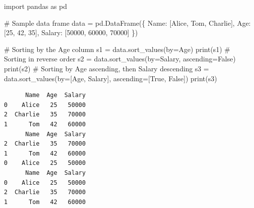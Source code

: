 \documentclass[
  english,
  letterpaper,
  DIV=11,
  numbers=noendperiod]{scrreprt}
\newenvironment{Shaded}{\begin{snugshade}}{\end{snugshade}}
\newcommand{\BuiltInTok}[1]{\textcolor[rgb]{0.00,0.23,0.31}{#1}}
\newcommand{\CommentTok}[1]{\textcolor[rgb]{0.37,0.37,0.37}{#1}}
\newcommand{\DecValTok}[1]{\textcolor[rgb]{0.68,0.00,0.00}{#1}}
\newcommand{\ImportTok}[1]{\textcolor[rgb]{0.00,0.46,0.62}{#1}}
\newcommand{\NormalTok}[1]{\textcolor[rgb]{0.00,0.23,0.31}{#1}}
\newcommand{\OperatorTok}[1]{\textcolor[rgb]{0.37,0.37,0.37}{#1}}
\newcommand{\StringTok}[1]{\textcolor[rgb]{0.13,0.47,0.30}{#1}}
\newcommand{\VariableTok}[1]{\textcolor[rgb]{0.07,0.07,0.07}{#1}}
\begin{document}
\begin{Shaded}
\begin{Highlighting}[]
\ImportTok{import}\NormalTok{ pandas }\ImportTok{as}\NormalTok{ pd}

\CommentTok{\# Sample data frame}
\NormalTok{data }\OperatorTok{=}\NormalTok{ pd.DataFrame(\{}
    \StringTok{\textquotesingle{}Name\textquotesingle{}}\NormalTok{: [}\StringTok{\textquotesingle{}Alice\textquotesingle{}}\NormalTok{, }\StringTok{\textquotesingle{}Tom\textquotesingle{}}\NormalTok{, }\StringTok{\textquotesingle{}Charlie\textquotesingle{}}\NormalTok{],}
    \StringTok{\textquotesingle{}Age\textquotesingle{}}\NormalTok{: [}\DecValTok{25}\NormalTok{, }\DecValTok{42}\NormalTok{, }\DecValTok{35}\NormalTok{],}
    \StringTok{\textquotesingle{}Salary\textquotesingle{}}\NormalTok{: [}\DecValTok{50000}\NormalTok{, }\DecValTok{60000}\NormalTok{, }\DecValTok{70000}\NormalTok{]}
\NormalTok{\})}

\CommentTok{\# Sorting by the \textquotesingle{}Age\textquotesingle{} column}
\NormalTok{s1 }\OperatorTok{=}\NormalTok{ data.sort\_values(by}\OperatorTok{=}\StringTok{\textquotesingle{}Age\textquotesingle{}}\NormalTok{)}
\BuiltInTok{print}\NormalTok{(s1)}
\CommentTok{\# Sorting in reverse order}
\NormalTok{s2 }\OperatorTok{=}\NormalTok{ data.sort\_values(by}\OperatorTok{=}\StringTok{\textquotesingle{}Salary\textquotesingle{}}\NormalTok{, ascending}\OperatorTok{=}\VariableTok{False}\NormalTok{)}
\BuiltInTok{print}\NormalTok{(s2)}
\CommentTok{\# Sorting by \textquotesingle{}Age\textquotesingle{} ascending, then \textquotesingle{}Salary\textquotesingle{} descending}
\NormalTok{s3 }\OperatorTok{=}\NormalTok{ data.sort\_values(by}\OperatorTok{=}\NormalTok{[}\StringTok{\textquotesingle{}Age\textquotesingle{}}\NormalTok{, }\StringTok{\textquotesingle{}Salary\textquotesingle{}}\NormalTok{], ascending}\OperatorTok{=}\NormalTok{[}\VariableTok{True}\NormalTok{, }\VariableTok{False}\NormalTok{])}
\BuiltInTok{print}\NormalTok{(s3)}
\end{Highlighting}
\end{Shaded}

\begin{verbatim}
      Name  Age  Salary
0    Alice   25   50000
2  Charlie   35   70000
1      Tom   42   60000
      Name  Age  Salary
2  Charlie   35   70000
1      Tom   42   60000
0    Alice   25   50000
      Name  Age  Salary
0    Alice   25   50000
2  Charlie   35   70000
1      Tom   42   60000
\end{verbatim}
\end{document}
